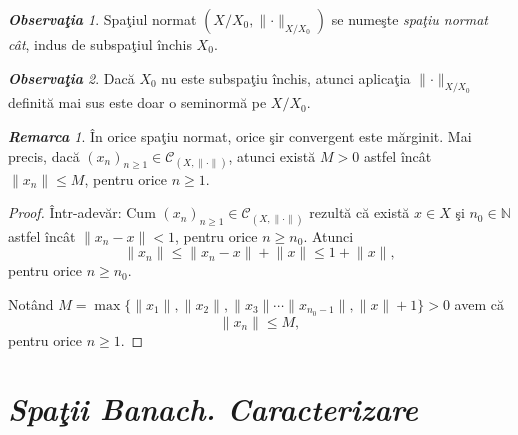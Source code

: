 \documentclass[ a4paper, 12pt]{report}
\theoremstyle{definition}
\theoremstyle{remark}
\newtheorem{remarc}{\bf Remarca}[section]
\newtheorem{obs}{\bf Observa\c tia }[section]
\numberwithin{equation}{section}
\begin{document}
\begin{obs}
Spa\c tiul normat $\left(  X/X_0, \lVert \cdot \rVert_{X/X_0} \right)$ se nume\c ste \emph{spa\c tiu normat c\^at}, indus de subspa\c tiul \^inchis $X_0$.
\end{obs}
\begin{obs}
Dac\u a $X_0$ nu este subspa\c tiu \^inchis, atunci aplica\c tia $\lVert \cdot \rVert_{X/X_0}$ definit\u a mai sus este doar o seminorm\u a pe $X/X_0.$
\end{obs}
\begin{remarc}
\^In orice spa\c tiu normat, orice \c sir convergent este m\u arginit. Mai precis,  dac\u a $(x_n)_{n \geq 1} \in \mathcal{C}_{(X, \lVert \cdot \rVert)}$,  atunci exist\u a $ M>0$ astfel \^inc\^at $\lVert x_n \rVert \leq M$, pentru orice $ n \geq 1.$
\end{remarc}

\begin{proof}
\^Intr-adev\u ar: Cum $(x_n)_{n \geq 1} \in \mathcal{C}_{(X, \lVert \cdot \rVert)}$ rezult\u a c\u a exist\u a  $x \in X$ \c si $n_0 \in \mathbb{N}$ astfel \^inc\^at $\lVert x_n - x \rVert <1$, pentru orice  $n \geq n_0$. Atunci 
$$ \lVert x_n \rVert \leq \lVert x_n - x \rVert +  \lVert x \rVert \leq 1 +  \lVert x \rVert,$$ pentru orice $ n \geq n_0.$

Not\^and $M = \max\{ \lVert x_1 \rVert, \lVert x_2 \rVert, \lVert x_3 \rVert \cdots \lVert x_{n_{0} -1} \rVert, \lVert x \rVert +1 \} >0$ avem c\u a
 $$\lVert x_n \rVert \leq M,$$ pentru orice $ n \geq 1.$
\end{proof}







\section{\textit{Spa\c tii Banach. Caracterizare}}
\end{document}
